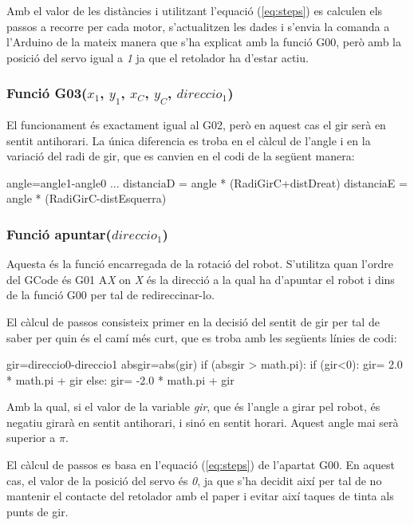 Amb el valor de les distàncies i utilitzant l’equació (\ref{eq:steps}) es calculen els passos a recorre per cada motor, s’actualitzen les dades i s’envia la comanda a l’Arduino de la mateix manera que s’ha explicat amb la funció G00, però amb la posició del servo igual a \emph{1} ja que el retolador ha d’estar actiu. 

\subsubsection{Funció G03($x_{1}$, $y_{1}$, $x_{C}$, $y_{C}$, $direccio_{1}$)}
El funcionament és exactament igual al G02, però en aquest cas el gir serà en sentit antihorari. La única diferencia es troba en el càlcul de l’angle i en la variació del radi de gir, que es canvien en el codi de la següent manera: 

\begin{python}
	angle=angle1-angle0
	...
	distanciaD = angle * (RadiGirC+distDreat) 
	distanciaE = angle * (RadiGirC-distEsquerra)
\end{python}
\subsubsection{Funció apuntar($direccio_{1}$)}\label{apuntar}

Aquesta és la funció encarregada de la rotació del robot. S’utilitza quan l’ordre del GCode és G01 A\emph{X} on \emph{X} és la direcció a la qual ha d’apuntar el robot i dins de la funció G00 per tal de redireccinar-lo. 

El càlcul de passos consisteix primer en la decisió del sentit de gir per tal de saber per quin és el camí més curt, que es troba amb les següents línies de codi:
\begin{python}
	gir=direccio0-direccio1 
	absgir=abs(gir) 
	if (absgir > math.pi):
		if (gir<0):
			gir= 2.0 * math.pi + gir 
		else:
			gir= -2.0 * math.pi + gir
\end{python}
Amb la qual, si el valor de la variable \emph{gir}, que és l’angle a girar pel robot, és negatiu girarà en sentit antihorari, i sinó en sentit horari. Aquest angle mai serà superior a $\pi$. 

El càlcul de passos es basa en l’equació (\ref{eq:steps}) de l’apartat G00. En aquest cas, el valor de la posició del servo és \emph{0}, ja que s’ha decidit així per tal de no mantenir el contacte del retolador amb el paper i evitar així taques de tinta als punts de gir. 





